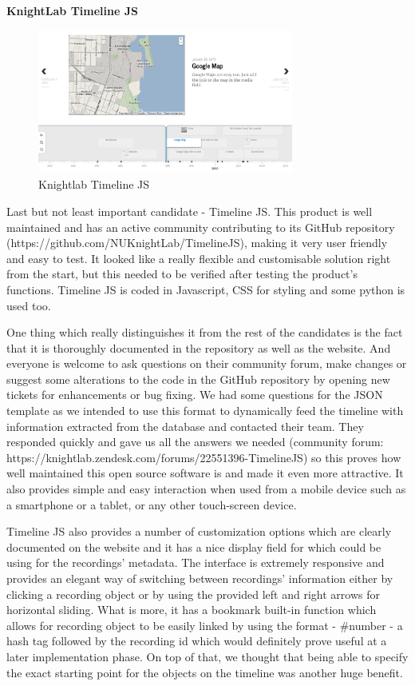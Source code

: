 \documentclass{l3proj}
\begin{document}
\textbf{KnightLab Timeline JS}

\begin{figure}[ht!]
  \centering
\includegraphics[width=0.75\textwidth]{images/timeline-example.png}
\caption{Knightlab Timeline JS}
\end{figure}

Last but not least important candidate - Timeline JS. This product is well maintained and has an active community contributing to its GitHub repository (https://github.com/NUKnightLab/TimelineJS), making it very user friendly and easy to test. It looked like a really flexible and customisable solution right from the start, but this needed to be verified after testing the product's functions. Timeline JS is coded in Javascript, CSS for styling and some python is used too.

One thing which really distinguishes it from the rest of the candidates is the fact that it is thoroughly documented in the repository as well as the website. And everyone is welcome to ask questions on their community forum, make changes or suggest some alterations to the code in the GitHub repository by opening new tickets for enhancements or bug fixing. We had some questions for the JSON template as we intended to use this format to dynamically feed the timeline with information extracted from the database and contacted their team. They responded quickly and gave us all the answers we needed (community forum: https://knightlab.zendesk.com/forums/22551396-TimelineJS) so this proves how well maintained this open source software is and made it even more attractive. It also provides simple and easy interaction when used from a mobile device such as a smartphone or a tablet, or any other touch-screen device.

Timeline JS also provides a number of customization options which are clearly documented on the website and it has a nice display field for which could be using for the recordings' metadata. The interface is extremely responsive and provides an elegant way of switching between recordings' information either by clicking a recording object or by using the provided left and right arrows for horizontal sliding. What is more, it has a bookmark built-in function which allows for recording object to be easily linked by using the format - #number - a hash tag followed by the recording id which would definitely prove useful at a later implementation phase. On top of that, we thought that being able to specify the exact starting point for the objects on the timeline was another huge benefit.
\end{document}
